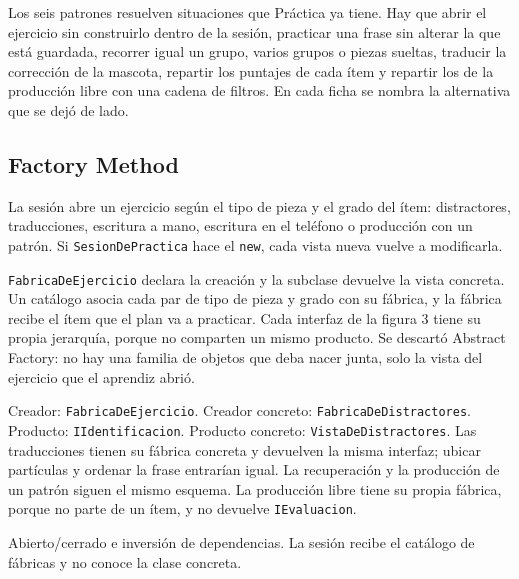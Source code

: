 \documentclass[11pt]{article}
\begin{document}
Los seis patrones resuelven situaciones que Práctica ya tiene. Hay que abrir el ejercicio sin construirlo dentro de la sesión, practicar una frase sin alterar la que está guardada, recorrer igual un grupo, varios grupos o piezas sueltas, traducir la corrección de la mascota, repartir los puntajes de cada ítem y repartir los de la producción libre con una cadena de filtros. En cada ficha se nombra la alternativa que se dejó de lado.

\subsection{Factory Method}

\begin{description}
  \raggedright
  \item[Problema.] La sesión abre un ejercicio según el tipo de pieza y el grado del ítem: distractores, traducciones, escritura a mano, escritura en el teléfono o producción con un patrón. Si \texttt{SesionDePractica} hace el \texttt{new}, cada vista nueva vuelve a modificarla.
  \item[Solución.] \texttt{FabricaDeEjercicio} declara la creación y la subclase devuelve la vista concreta. Un catálogo asocia cada par de tipo de pieza y grado con su fábrica, y la fábrica recibe el ítem que el plan va a practicar. Cada interfaz de la figura 3 tiene su propia jerarquía, porque no comparten un mismo producto. Se descartó Abstract Factory: no hay una familia de objetos que deba nacer junta, solo la vista del ejercicio que el aprendiz abrió.
  \item[Participantes.] Creador: \texttt{FabricaDeEjercicio}. Creador concreto: \texttt{FabricaDeDistractores}. Producto: \texttt{IIdentificacion}. Producto concreto: \texttt{VistaDeDistractores}. Las traducciones tienen su fábrica concreta y devuelven la misma interfaz; ubicar partículas y ordenar la frase entrarían igual. La recuperación y la producción de un patrón siguen el mismo esquema. La producción libre tiene su propia fábrica, porque no parte de un ítem, y no devuelve \texttt{IEvaluacion}.
  \item[SOLID.] Abierto/cerrado e inversión de dependencias. La sesión recibe el catálogo de fábricas y no conoce la clase concreta.
\end{description}
\end{document}
